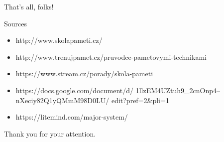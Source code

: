 
\begin{frame}{That's all, folks!}
  \begin{block}{Sources}
    \begin{itemize}
      \item http://www.skolapameti.cz/
      \item http://www.trenujpamet.cz/pruvodce-pametovymi-technikami
      \item https://www.stream.cz/porady/skola-pameti
      \item https://docs.google.com/document/d/
        1llzEM4UZtuh9\_2cnOnp4--nXeciy82Q1yQMmM98D0LU/
        edit?pref=2\&pli=1
      \item https://litemind.com/major-system/
    \end{itemize}
  \end{block}

  \begin{block}{}
    Thank you for your attention. 
  \end{block}
\end{frame}

